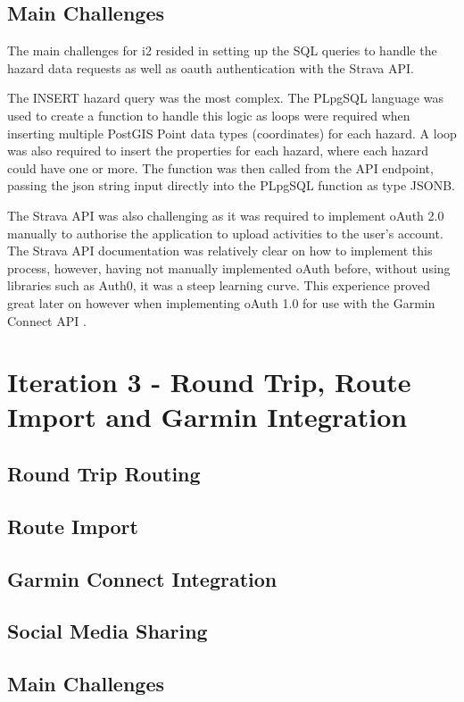 \subsection{Main Challenges}
\label{iteration2:main-challenges}

The main challenges for i2 resided in setting up the SQL queries to handle the hazard data requests as well as oauth authentication with the Strava API.

The INSERT hazard query was the most complex. The PLpgSQL language was used to create a function to handle  this logic as loops were required when inserting multiple PostGIS Point data types (coordinates) for each hazard. A loop was also required to insert the properties for each hazard, where each hazard could have one or more. The function was then called from the API endpoint, passing the json string input directly into the PLpgSQL function as type JSONB.

The Strava API was also challenging as it was required to implement oAuth 2.0 manually to authorise the application to upload activities to the user's account. The Strava API documentation was relatively clear on how to implement this process, however, having not manually implemented oAuth before, without using libraries such as Auth0, it was a steep learning curve. This experience proved great later on however when implementing oAuth 1.0 for use with the Garmin Connect API .

\section{Iteration 3 - Round Trip, Route Import and Garmin Integration}
\label{implementation:iteration3}

\subsection{Round Trip Routing}

\subsection{Route Import}

\subsection{Garmin Connect Integration}
\label{iteration3:garmin-integration}

\subsection{Social Media Sharing}

\subsection{Main Challenges}
